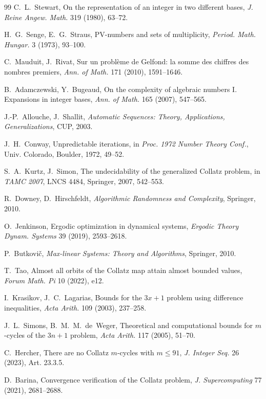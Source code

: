 \documentclass[11pt]{article}
\begin{document}
\begin{thebibliography}{99}
 C.~L.~Stewart, On the representation of an integer
in two different bases, \emph{J. Reine Angew. Math.} 319 (1980),
63--72.

 H.~G.~Senge, E.~G.~Straus, PV-numbers and sets
of multiplicity, \emph{Period. Math. Hungar.} 3 (1973), 93--100.

 C.~Mauduit, J.~Rivat, Sur un probl\`eme de
Gelfond: la somme des chiffres des nombres premiers, \emph{Ann. of
Math.} 171 (2010), 1591--1646.

 B.~Adamczewski, Y.~Bugeaud, On the
complexity of algebraic numbers I. Expansions in integer bases,
\emph{Ann. of Math.} 165 (2007), 547--565.

 J.-P.~Allouche, J.~Shallit, \emph{Automatic
Sequences: Theory, Applications, Generalizations}, CUP, 2003.

 J.~H.~Conway, Unpredictable iterations, in
\emph{Proc. 1972 Number Theory Conf.}, Univ. Colorado, Boulder, 1972,
49--52.

 S.~A.~Kurtz, J.~Simon, The undecidability of the
generalized Collatz problem, in \emph{TAMC 2007}, LNCS 4484,
Springer, 2007, 542--553.

 R.~Downey, D.~Hirschfeldt,
\emph{Algorithmic Randomness and Complexity}, Springer, 2010.

 O.~Jenkinson, Ergodic optimization in dynamical
systems, \emph{Ergodic Theory Dynam. Systems} 39 (2019), 2593--2618.

 P.~Butkovi\v{c}, \emph{Max-linear Systems: Theory
and Algorithms}, Springer, 2010.

 T.~Tao, Almost all orbits of the Collatz map attain
almost bounded values, \emph{Forum Math. Pi} 10 (2022), e12.

 I.~Krasikov, J.~C.~Lagarias, Bounds for
the $3x+1$ problem using difference inequalities, \emph{Acta Arith.}
109 (2003), 237--258.

 J.~L.~Simons, B.~M.~M.~de~Weger, Theoretical
and computational bounds for $m$-cycles of the $3n+1$ problem,
\emph{Acta Arith.} 117 (2005), 51--70.

 C.~Hercher, There are no Collatz $m$-cycles with
$m\le91$, \emph{J. Integer Seq.} 26 (2023), Art. 23.3.5.

 D.~Barina, Convergence verification of the Collatz
problem, \emph{J. Supercomputing} 77 (2021), 2681--2688.


\end{thebibliography}
\end{document}
